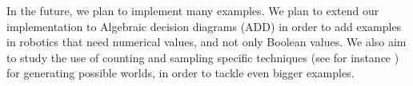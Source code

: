 In the future, we plan to implement many examples. We plan to extend our implementation to Algebraic decision diagrams (ADD) \cite{DBLP:journals/fmsd/BaharFGHMPS97} in order to add examples in robotics that need numerical values, and not only Boolean values.
%
We also aim to study the use of counting and sampling specific techniques (see for instance \citet{DBLP:conf/aaai/MeelVCFSFIM16}) for generating possible worlds, in order to tackle even bigger examples.

